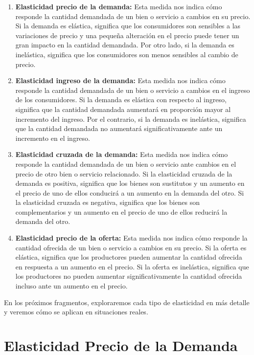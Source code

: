 \documentclass[
  jou,
  floatsintext,
  longtable,
  a4paper,
  nolmodern,
  notxfonts,
  notimes,
  12pt,
  colorlinks=true,linkcolor=blue,citecolor=blue,urlcolor=blue]{apa7}
\begin{document}
\begin{enumerate}
\def\labelenumi{\arabic{enumi}.}
\item
  \textbf{Elasticidad precio de la demanda:} Esta medida nos indica cómo
  responde la cantidad demandada de un bien o servicio a cambios en su
  precio. Si la demanda es elástica, significa que los consumidores son
  sensibles a las variaciones de precio y una pequeña alteración en el
  precio puede tener un gran impacto en la cantidad demandada. Por otro
  lado, si la demanda es inelástica, significa que los consumidores son
  menos sensibles al cambio de precio.
\item
  \textbf{Elasticidad ingreso de la demanda:} Esta medida nos indica
  cómo responde la cantidad demandada de un bien o servicio a cambios en
  el ingreso de los consumidores. Si la demanda es elástica con respecto
  al ingreso, significa que la cantidad demandada aumentará en
  proporción mayor al incremento del ingreso. Por el contrario, si la
  demanda es inelástica, significa que la cantidad demandada no
  aumentará significativamente ante un incremento en el ingreso.
\item
  \textbf{Elasticidad cruzada de la demanda:} Esta medida nos indica
  cómo responde la cantidad demandada de un bien o servicio ante cambios
  en el precio de otro bien o servicio relacionado. Si la elasticidad
  cruzada de la demanda es positiva, significa que los bienes son
  sustitutos y un aumento en el precio de uno de ellos conducirá a un
  aumento en la demanda del otro. Si la elasticidad cruzada es negativa,
  significa que los bienes son complementarios y un aumento en el precio
  de uno de ellos reducirá la demanda del otro.
\item
  \textbf{Elasticidad precio de la oferta:} Esta medida nos indica cómo
  responde la cantidad ofrecida de un bien o servicio a cambios en su
  precio. Si la oferta es elástica, significa que los productores pueden
  aumentar la cantidad ofrecida en respuesta a un aumento en el precio.
  Si la oferta es inelástica, significa que los productores no pueden
  aumentar significativamente la cantidad ofrecida incluso ante un
  aumento en el precio.
\end{enumerate}

En los próximos fragmentos, exploraremos cada tipo de elasticidad en más
detalle y veremos cómo se aplican en situaciones reales.

\section{Elasticidad Precio de la
Demanda}\label{elasticidad-precio-de-la-demanda}
\end{document}
